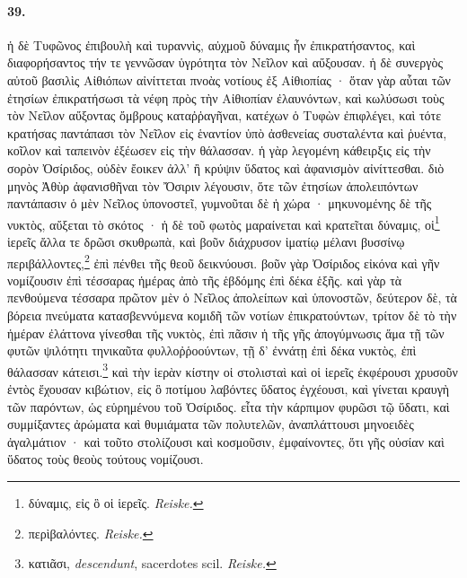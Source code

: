 \documentclass[a4paper, 11pt, oneside, polutonikogreek, german]{article}
\begin{document}
\paragraph{39.}
ἡ δὲ Τυφῶνος ἐπιβουλὴ καὶ τυραννὶς, αὐχμοῦ δύναμις ἦν ἐπικρατήσαντος, καὶ διαφορήσαντος τήν τε γεννῶσαν ὑγρότητα τὸν Νεῖλον καὶ αὔξουσαν. ἡ δὲ συνεργὸς αὐτοῦ βασιλὶς Αἰθιόπων αἰνίττεται πνοὰς νοτίους ἐξ Αἰθιοπίας · ὅταν γὰρ αὗται τῶν ἐτησίων ἐπικρατήσωσι τὰ νέφη πρὸς τὴν Αἰθιοπίαν ἐλαυνόντων, καὶ κωλύσωσι τοὺς τὸν Νεῖλον αὔξοντας ὄμβρους καταῤῥαγῆναι, κατέχων ὁ Τυφὼν ἐπιφλέγει, καὶ τότε κρατήσας παντάπασι τὸν Νεῖλον εἰς ἑναντίον ὑπὸ ἀσθενείας συσταλέντα καὶ ῥυέντα, κοῖλον καὶ ταπεινὸν ἐξέωσεν εἰς τὴν θάλασσαν. ἡ γὰρ λεγομένη κάθειρξις εἰς τὴν σορὸν Ὀσίριδος, οὐδὲν ἔοικεν ἀλλ' ἢ κρύψιν ὕδατος καὶ ἀφανισμὸν αἰνίττεσθαι. διὸ μηνὸς Ἀθὺρ ἀφανισθῆναι τὸν Ὄσιριν λέγουσιν, ὅτε τῶν ἐτησίων ἀπολειπόντων παντάπασιν ὁ μὲν Νεῖλος ὑπονοστεῖ, γυμνοῦται δὲ ἡ χώρα · μηκυνομένης δὲ τῆς νυκτὸς, αὔξεται τὸ σκότος · ἡ δὲ τοῦ φωτὸς μαραίνεται καὶ κρατεῖται δύναμις, οἱ\footnote{δύναμις, εἰς ὃ οἱ ἱερεῖς. \emph{Reiske.}} ἱερεῖς ἄλλα τε δρῶσι σκυθρωπὰ, καὶ βοῦν διάχρυσον ἱματίῳ μέλανι βυσσίνῳ περιβάλλοντες,\footnote{περὶβαλόντες. \emph{Reiske.}} ἐπὶ πένθει τῆς θεοῦ δεικνύουσι. βοῦν γὰρ Ὀσίριδος εἰκόνα καὶ γῆν νομίζουσιν ἐπὶ τέσσαρας ἡμέρας ἀπὸ τῆς ἑβδόμης ἐπὶ δέκα ἑξῆς. καὶ γὰρ τὰ πενθούμενα τέσσαρα πρῶτον μὲν ὁ Νεῖλος ἀπολείπων καὶ ὑπονοστῶν, δεύτερον δὲ, τὰ βόρεια πνεύματα κατασβεννύμενα κομιδῆ τῶν νοτίων ἐπικρατούντων, τρίτον δὲ τὸ τὴν ἡμέραν ἐλάττονα γίνεσθαι τῆς νυκτὸς, ἐπὶ πᾶσιν ἡ τῆς γῆς ἀπογύμνωσις ἅμα τῇ τῶν φυτῶν ψιλότητι τηνικαῦτα φυλλοῤῥοούντων, τῇ δ' ἐννάτῃ ἐπὶ δέκα νυκτὸς, ἐπὶ θάλασσαν κάτεισι.\footnote{κατιᾶσι, \emph{descendunt}, sacerdotes scil. \emph{Reiske.}} καὶ τὴν ἱερὰν κίστην οἱ στολισταὶ καὶ οἱ ἱερεῖς ἐκφέρουσι χρυσοῦν ἐντὸς ἔχουσαν κιβώτιον, εἰς ὃ ποτίμου λαβόντες ὕδατος ἐγχέουσι, καὶ γίνεται κραυγὴ τῶν παρόντων, ὡς εὑρημένου τοῦ Ὀσίριδος. εἶτα τὴν κάρπιμον φυρῶσι τῷ ὕδατι, καὶ συμμίξαντες ἀρώματα καὶ θυμιάματα τῶν πολυτελῶν, ἀναπλάττουσι μηνοειδὲς ἀγαλμάτιον · καὶ τοῦτο στολίζουσι καὶ κοσμοῦσιν, ἐμφαίνοντες, ὅτι γῆς οὐσίαν καὶ ὕδατος τοὺς θεοὺς τούτους νομίζουσι.
\end{document}

